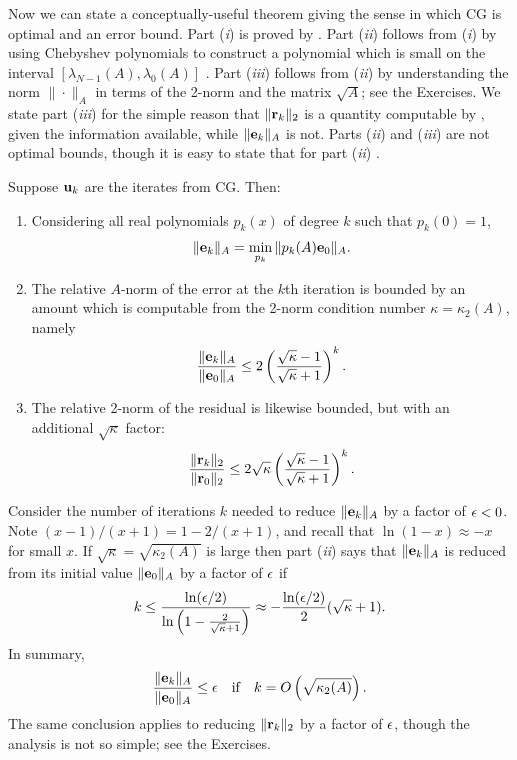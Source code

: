 Now we can state a conceptually-useful theorem giving the sense in which CG is optimal and an error bound.  Part (\emph{i}) is proved by \citet[p.~50]{Greenbaum1997}.  Part (\emph{ii}) follows from (\emph{i}) by using Chebyshev polynomials to construct a polynomial which is small on the interval $[\lambda_{N-1}(A),\lambda_0(A)]$ \citep[p.~51]{Greenbaum1997}.  Part (\emph{iii}) follows from (\emph{ii}) by understanding the norm $\|\cdot\|_A$ in terms of the 2-norm and the matrix $\sqrt{A}$; see the Exercises.  We state part (\emph{iii}) for the simple reason that $\|\mathbf{r}_k\|_2$ is a quantity computable by \PETSc, given the information available, while $\|\mathbf{e}_k\|_A$ is not.  Parts (\emph{ii}) and (\emph{iii}) are not optimal bounds, though it is easy to state that for part (\emph{ii}) \citep[p.~51]{Greenbaum1997}.

\renewcommand{\labelenumi}{(\roman{enumi})}
\begin{theorem}  \label{thm:cgiterations}
Suppose $\mathbf{u}_k$ are the iterates from CG.  Then:\begin{enumerate}
\item Considering all real polynomials $p_k(x)$ of degree $k$ such that $p_k(0)=1$,
    $$\|\mathbf{e}_k\|_A = \min_{p_k} \|p_k(A) \mathbf{e}_0\|_A.$$
\item The relative $A$-norm of the error at the $k$th iteration is bounded by an amount which is computable from the 2-norm condition number $\kappa=\kappa_2(A)$, namely
	$$\frac{\|\mathbf{e}_k\|_A}{\|\mathbf{e}_0\|_A} \le 2 \left(\frac{\sqrt{\kappa}-1}{\sqrt{\kappa}+1}\right)^k.$$
\item The relative 2-norm of the residual is likewise bounded, but with an additional $\sqrt{\kappa}$ factor:
	$$\frac{\|\mathbf{r}_k\|_2}{\|\mathbf{r}_0\|_2} \le 2 \sqrt{\kappa} \left(\frac{\sqrt{\kappa}-1}{\sqrt{\kappa}+1}\right)^k.$$
\end{enumerate}
\end{theorem}

Consider the number of iterations $k$ needed to reduce $\|\mathbf{e}_k\|_A$ by a factor of $\epsilon<0$.  Note $(x-1)/(x+1) = 1 - 2/(x+1)$, and recall that $\ln(1-x) \approx -x$ for small $x$.  If $\sqrt{\kappa} = \sqrt{\kappa_2(A)}$ is large then part (\emph{ii}) says that $\|\mathbf{e}_k\|_A$ is reduced from its initial value $\|\mathbf{e}_0\|_A$ by a factor of $\epsilon$ if
    $$k \le \frac{\ln(\epsilon/2)}{\ln\left(1 - \frac{2}{\sqrt{\kappa}+1}\right)} \approx -\frac{\ln(\epsilon/2)}{2} (\sqrt{\kappa}+1).$$
In summary,
\begin{equation}
\frac{\|\mathbf{e}_k\|_A}{\|\mathbf{e}_0\|_A} \le \epsilon \quad \text{if} \quad k = O\left(\sqrt{\kappa_2(A)}\right).  \label{cgkappaiter}
\end{equation}
The same conclusion applies to reducing $\|\mathbf{r}_k\|_2$ by a factor of $\epsilon$, though the analysis is not so simple; see the Exercises.

